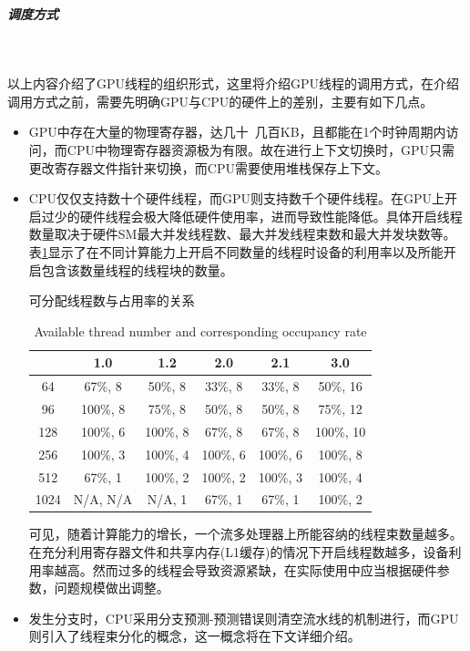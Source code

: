 \subparagraph{调度方式}~{}
\par 以上内容介绍了GPU线程的组织形式，这里将介绍GPU线程的调用方式，在介绍调用方式之前，需要先明确GPU与CPU的硬件上的差别，主要有如下几点。
\begin{itemize}
	\item GPU中存在大量的物理寄存器，达几十~几百KB，且都能在1个时钟周期内访问，而CPU中物理寄存器资源极为有限。故在进行上下文切换时，GPU只需更改寄存器文件指针来切换，而CPU需要使用堆栈保存上下文。
	\item CPU仅仅支持数十个硬件线程，而GPU则支持数千个硬件线程。在GPU上开启过少的硬件线程会极大降低硬件使用率，进而导致性能降低。具体开启线程数量取决于硬件SM最大并发线程数、最大并发线程束数和最大并发块数等。表\ref{table-占用率}显示了在不同计算能力上开启不同数量的线程时设备的利用率以及所能开启包含该数量线程的线程块的数量。\\
	\begin{table}
		\centering
		\renewcommand{\thetable}{\arabic{section}-\arabic{table} }
		\renewcommand{\tablename}{表}
		\caption{可分配线程数与占用率的关系}
		\addtocounter{table}{-1}
		\renewcommand{\thetable}{\arabic{section}-\arabic{table} }
		\renewcommand{\tablename}{Table}
		\caption{Available thread number and corresponding occupancy rate}
		\begin{tabular}{cccccc}
			\toprule
			&	1.0	&1.2	&2.0	&2.1	&3.0 \\
			\midrule
			64	&	67\%, 8		&	50\%, 8		&	33\%, 8		&	33\%, 8		&	50\%, 16	\\
			96	&	100\%, 8	&	75\%, 8		&	50\%, 8		&	50\%, 8		&	75\%, 12	\\
			128	&	100\%, 6	&	100\%, 8	&	67\%, 8		&	67\%, 8		&	100\%, 10	\\
			256	&	100\%, 3	&	100\%, 4	&	100\%, 6	&	100\%, 6	&	100\%, 8	\\
			512	&	67\%, 1		&	100\%, 2	&	100\%, 2	&	100\%, 3	&	100\%, 4	\\
			1024&	N/A, N/A	&	N/A, 1		&	67\%, 1		&	67\%, 1		&	100\%, 2	\\
			
			\bottomrule
		\end{tabular} \label{table-占用率}
	\end{table}
	可见，随着计算能力的增长，一个流多处理器上所能容纳的线程束数量越多。在充分利用寄存器文件和共享内存(L1缓存)的情况下开启线程数越多，设备利用率越高。然而过多的线程会导致资源紧缺，在实际使用中应当根据硬件参数，问题规模做出调整。
	\item 发生分支时，CPU采用分支预测-预测错误则清空流水线的机制进行，而GPU则引入了线程束分化的概念，这一概念将在下文详细介绍。
\end{itemize}

